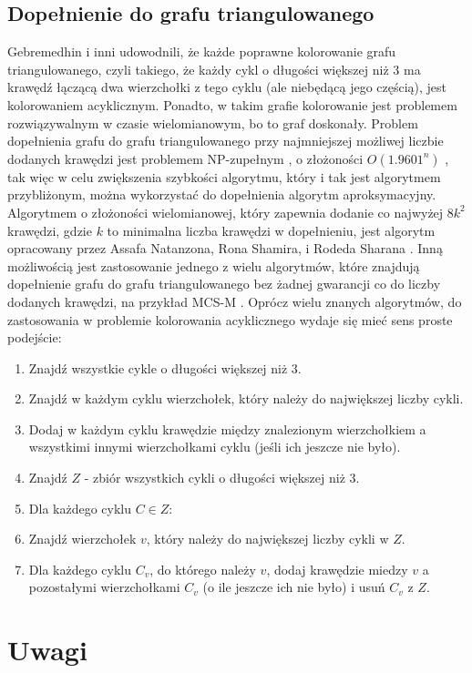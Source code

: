 \documentclass{article}
\begin{document}
\subsection{Dopełnienie do grafu triangulowanego}
Gebremedhin i inni udowodnili, że każde poprawne kolorowanie grafu triangulowanego, czyli takiego, że każdy cykl o długości większej niż 3 ma krawędź łączącą dwa wierzchołki z tego cyklu (ale niebędącą jego częścią), jest kolorowaniem acyklicznym. \cite{Gb} Ponadto, w takim grafie kolorowanie jest problemem rozwiązywalnym w czasie wielomianowym, bo to graf doskonały.
Problem dopełnienia grafu do grafu triangulowanego przy najmniejszej możliwej liczbie dodanych krawędzi jest problemem NP-zupełnym \cite{NPC}, o złożoności $O(1.9601^n)$ \cite{Cmp}, tak więc w celu zwiększenia szybkości algorytmu, który i tak jest algorytmem przybliżonym, można wykorzystać do dopełnienia algorytm aproksymacyjny. Algorytmem o złożoności wielomianowej, który zapewnia dodanie co najwyżej $8k^2$ krawędzi, gdzie $k$ to minimalna liczba krawędzi w dopełnieniu, jest algorytm opracowany przez Assafa Natanzona, Rona Shamira, i Rodeda Sharana \cite{Approx}. Inną możliwością jest zastosowanie jednego z wielu algorytmów, które znajdują dopełnienie grafu do grafu triangulowanego bez żadnej gwarancji co do liczby dodanych krawędzi, na przykład MCS-M \cite{MCS-M}. Oprócz wielu znanych algorytmów, do zastosowania w problemie kolorowania acyklicznego wydaje się mieć sens proste podejście:
\begin{enumerate}
\item Znajdź wszystkie cykle o długości większej niż 3.
\item Znajdź w każdym cyklu wierzchołek, który należy do największej liczby cykli.
\item Dodaj w każdym cyklu krawędzie między znalezionym wierzchołkiem a wszystkimi innymi wierzchołkami cyklu (jeśli ich jeszcze nie było).
\item Znajdź $Z$ - zbiór wszystkich cykli o długości większej niż 3.
\item Dla każdego cyklu $C \in Z$:
\item Znajdź wierzchołek $v$, który należy do największej liczby cykli w $Z$.
\item Dla każdego cyklu $C_v$, do którego należy $v$, dodaj krawędzie miedzy $v$ a pozostałymi wierzchołkami $C_v$ (o ile jeszcze ich nie było) i usuń $C_v$ z $Z$.
\end{enumerate}
\section{Uwagi}
\end{document}

